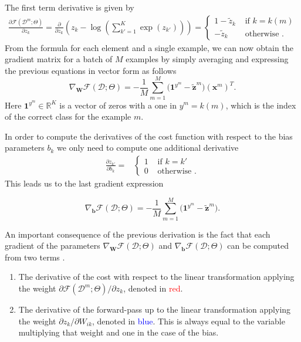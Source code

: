 \noindent The first term derivative is given by
%
\begin{align}
\frac{\partial \mathcal{F}(\mathcal{D}^m;\Theta)}{\partial z_{k}} = \frac{\partial }{\partial z_{k}}\left(z_k - \log\left(\sum_{k'=1}^{K} \exp(z_{k'}) \right) \right) = 
  \begin{cases}
      1 - \tilde{z}_k  &  \mbox{ if } k = k(m)\\ 
      -\tilde{z}_k    &  \mbox{ otherwise }.
  \end{cases}
  \label{eq:patialSoftmax}
\end{align}
%
From the formula for each element and a single example, we can now obtain the gradient matrix for a batch of $M$ examples by simply averaging and expressing the previous equations in vector form as follows
\begin{equation}
\nabla_\mathbf{W}\mathcal{F}(\mathcal{D};\Theta) = -\frac{1}{M}\sum_{m=1}^{M} \Big(\mathrm{\mathbf{1}}^{y^m} - \tilde{\mathbf{z}}^m \Big) \left(\mathbf{x}^m\right)^T.
\label{gradWeigths}
\end{equation}
%
Here $\mathrm{\mathbf{1}}^{y^m} \in \mathbb{R}^{K}$ is a vector of zeros with a one in $y^m=k(m)$, which is 
the index of the correct class for the example $m$. 

In order to compute the derivatives of the cost function with respect to the
bias parameters $b_{k}$ we only need to compute one additional derivative
\begin{align}
\frac{\partial z_{k'}}{\partial b_{k}} = 
  &\begin{cases}
      1  &  \mbox{ if } k = k'\\ 
      0  &  \mbox{ otherwise }.
  \end{cases} 
  \label{eqn:eqsilonq}
\end{align}
%
This leads us to the last gradient expression

\begin{equation}
\nabla_\mathbf{b}\mathcal{F}(\mathcal{D};\Theta) = -\frac{1}{M}\sum_{m=1}^{M} \Big(\mathrm{\mathbf{1}}^{y^m} - \tilde{\mathbf{z}}^m \Big).
\label{eq:gradBias}
\end{equation}

\noindent An important consequence of the previous derivation is the fact that each 
gradient of the parameters $\nabla_\mathbf{W}\mathcal{F}(\mathcal{D};\Theta)$ and $\nabla_\mathbf{b}\mathcal{F}(\mathcal{D};\Theta)$ can be computed from two terms . 

\begin{enumerate}
\item The derivative of the cost with respect to the linear transformation applying the weight $\partial \mathcal{F}(\mathcal{D}^m;\Theta)/\partial z_k$, denoted in \textcolor{red}{red}.
\item The derivative of the forward-pass up to the linear transformation applying the weight $\partial z_k/\partial W_{ik}$, denoted in \textcolor{blue}{blue}. This is always equal to the variable multiplying that weight and one in the case of the bias.
\end{enumerate}

